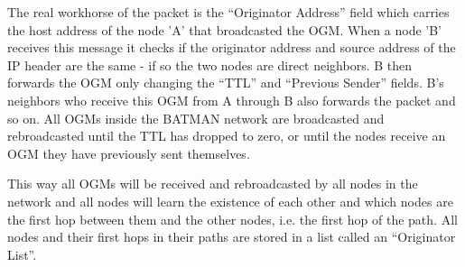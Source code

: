 The real workhorse of the packet is the ``Originator Address'' field which
carries the host address of the node 'A' that broadcasted the \ac{OGM}. When a
node 'B' receives this message it checks if the originator address and source
address of the IP header are the same - if so the two nodes are direct
neighbors. B then forwards the \ac{OGM} only changing the ``\ac{TTL}'' and
``Previous Sender'' fields. B's neighbors who receive this OGM from A through
B also forwards the packet and so on. All \acp{OGM} inside the BATMAN network
are broadcasted and rebroadcasted until the TTL has dropped to zero, or until
the nodes receive an \ac{OGM} they have previously sent themselves.

This way all \acp{OGM} will be received and rebroadcasted by all nodes in the
network and all nodes will learn the existence of each other and which nodes are
the first hop between them and the other nodes, i.e. the first hop of the path.
All nodes and their first hops in their paths are stored in a list called an
``Originator List''.

